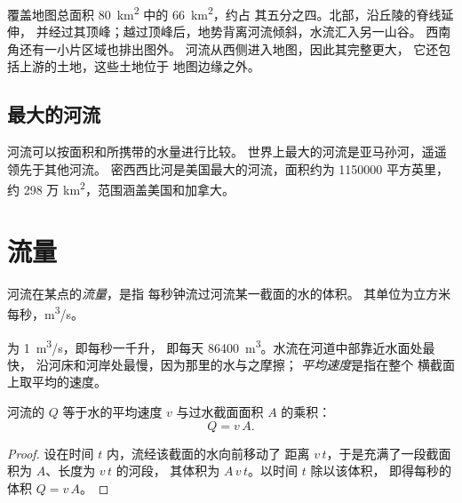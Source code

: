 覆盖地图总面积 \qty{80}{km^2} 中的 \qty{66}{km^2}，约占
其五分之四。北部，沿丘陵的脊线延伸，
并经过其顶峰；越过顶峰后，地势背离河流倾斜，水流汇入另一山谷。
西南角还有一小片区域也排出图外。
河流从西侧进入地图，因此其完整更大，
它还包括上游的土地，这些土地位于
地图边缘之外。

\subsection*{最大的河流}

河流可以按面积和所携带的水量进行比较。
世界上最大的河流是亚马孙河，遥遥领先于其他河流。
密西西比河是美国最大的河流，面积约为 \num{1150000} 平方英里，
约 298 万 \unit{km^2}，范围涵盖美国和加拿大。

\section{流量}

\begin{definition}[流量]\label{def:g10:drainage-basins:discharge}
河流在某点的\emph{流量}，是指
每秒钟流过河流某一截面的水的体积。
其单位为立方米每秒，\unit{m^3/s}。
\end{definition}

为 \qty{1}{m^3/s}，即每秒一千升，
即每天 \qty{86400}{m^3}。水流在河道中部靠近水面处最快，
沿河床和河岸处最慢，因为那里的水与之摩擦；
\emph{平均速度}是指在整个
横截面上取平均的速度。

\begin{proposition}[流量、速度与截面]\label{prop:g10:drainage-basins:discharge}
河流的 $Q$ 等于水的平均速度 $v$
与过水截面面积 $A$ 的乘积：
\[
Q = v\,A.
\]
\end{proposition}

\begin{proof}
设在时间 $t$ 内，流经该截面的水向前移动了
距离 $v\,t$，于是充满了一段截面积为 $A$、长度为 $v\,t$ 的河段，
其体积为 $A\,v\,t$。以时间 $t$ 除以该体积，
即得每秒的体积 $Q = v\,A$。
\end{proof}

